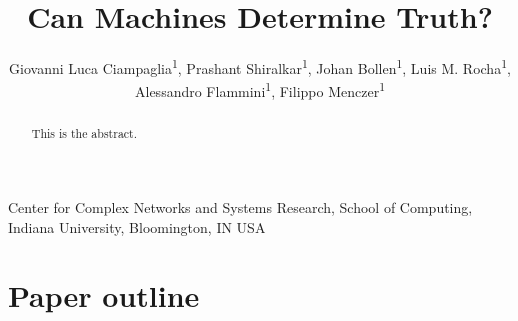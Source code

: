 \documentclass[10pt, letterpaper, english]{nature}
\author{
    Giovanni Luca Ciampaglia\textsuperscript{1},
    Prashant Shiralkar\textsuperscript{1},
    Johan Bollen\textsuperscript{1},
    Luis M. Rocha\textsuperscript{1},
    Alessandro Flammini\textsuperscript{1},
    Filippo Menczer\textsuperscript{1}
}
\title{Can Machines Determine Truth?}
\date{}
\begin{document}
\maketitle

\begin{affiliations}
\item Center for Complex Networks and Systems Research, School of Computing,
	Indiana University, Bloomington, IN USA
\end{affiliations}

\begin{abstract}
	This is the abstract.
\end{abstract}

\section*{Paper outline}
\end{document}
